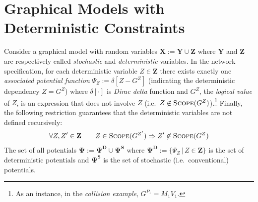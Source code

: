 \documentclass[letterpaper]{article}
\newcommand{\bvec}[1]{\textbf{#1}}
\begin{document}
\section{Graphical Models with Deterministic Constraints}
Consider a graphical model with random variables $\bvec{X} := \bvec{Y} \cup \bvec{Z}$
where $\bvec{Y}$ and $\bvec{Z}$ are respectively called \emph{stochastic} and \emph{deterministic}  variables.
In the network specification, for each deterministic variable $Z \in \bvec{Z}$ there exists exactly one \emph{associated potential function }
$\Psi_Z := \delta[Z - G^Z]$ (indicating the deterministic dependency $Z = G^Z$)
where $\delta[\cdot]$ is \emph{Dirac delta} function and $G^Z$, the \emph{logical value} of $Z$,  is an expression that does not involve $Z$ (i.e.\ $Z \not\in \textsc{Scope}(G^{Z})$).\footnote{
As an instance, in the \emph{collision example}, $G^{P_1} = M_1 V_1$.
}
Finally, the following restriction guarantees that the deterministic variables are not defined recursively:
\begin{equation*}
\forall Z, Z' \in \bvec{Z} \qquad Z \in \textsc{Scope}(G^{Z'}) \Rightarrow Z' \not\in \textsc{Scope}(G^Z)
\end{equation*}
The set of all potentials $\boldsymbol{\Psi} := \boldsymbol{\Psi^D} \cup \boldsymbol{\Psi^S}$
where
$\boldsymbol{\Psi^D} :=\{\Psi_Z \,|\, Z \in \bvec{Z}\}$ is the set of deterministic potentials
and $\boldsymbol{\Psi^S}$ is the set of stochastic (i.e.\ conventional) potentials. 
\end{document}
